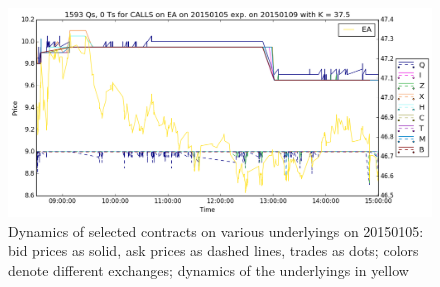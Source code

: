 \documentclass[a4paper,12pt]{article}
\theoremstyle{plain}
\theoremstyle{definition}
\begin{document}
\begin{figure}[H]
\begin{center}
 \endminipage
 \hspace{3mm}
 \includegraphics[width=\linewidth]{figures/contract_pics/EA_middle.png}
 \endminipage
\end{center}
\vspace{-3mm}
\caption{\footnotesize Dynamics of selected contracts on various underlyings on 20150105: bid prices as solid, ask prices as dashed lines, trades as dots; colors denote different exchanges; dynamics of the underlyings in yellow} 
\label{cntrt_pics_1}
\end{figure}
\vspace*{\fill}

\newpage
\end{document}
